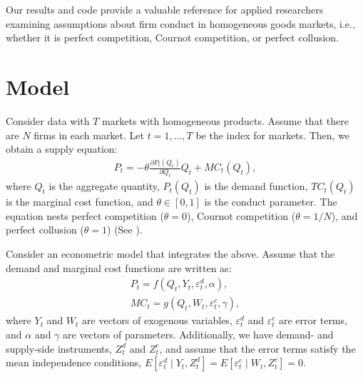 \documentclass[11pt, a4paper]{article}
\begin{document}
Our results and code provide a valuable reference for applied researchers examining assumptions about firm conduct in homogeneous goods markets, i.e., whether it is perfect competition, Cournot competition, or perfect collusion.

\section{Model}
Consider data with $T$ markets with homogeneous products.
Assume that there are $N$ firms in each market.
Let $t = 1,\ldots, T$ be the index for markets.
Then, we obtain a supply equation:
\begin{align}
     P_{t} = -\theta\frac{\partial P_{t}(Q_{t})}{\partial Q_{t}}Q_{t} + MC_{t}(Q_{t}),\label{eq:supply_equation}
\end{align}
where $Q_{t}$ is the aggregate quantity, $P_{t}(Q_{t})$ is the demand function, $TC_{t}(Q_{t})$ is the marginal cost function, and $\theta\in[0,1]$ is  the conduct parameter. 
The equation nests perfect competition ($\theta=0$), Cournot competition ($\theta=1/N$), and perfect collusion ($\theta=1$) (See \cite{bresnahan1982oligopoly}). 

Consider an econometric model that integrates the above.
Assume that the demand and marginal cost functions are written as: 
\begin{align}
    P_{t} = f(Q_{t}, Y_{t}, \varepsilon^{d}_{t}, \alpha), \label{eq:demand}\\
    MC_{t} = g(Q_{t}, W_{t}, \varepsilon^{c}_{t}, \gamma),\label{eq:marginal_cost}
\end{align}
where $Y_{t}$ and $W_{t}$ are vectors of exogenous variables, $\varepsilon^{d}_{t}$ and $\varepsilon^{c}_{t}$ are error terms, and $\alpha$ and $\gamma$ are vectors of parameters.
Additionally, we have demand- and supply-side instruments, $Z^{d}_{t}$ and $Z^{c}_{t}$, and assume that the error terms satisfy the mean independence conditions, $E[\varepsilon^{d}_{t}\mid Y_{t}, Z^{d}_{t}] = E[\varepsilon^{c}_{t} \mid W_{t}, Z^{c}_{t}] =0$.
\end{document}
